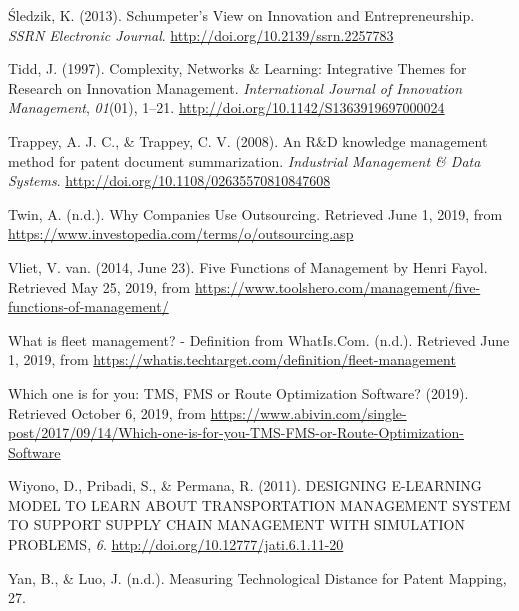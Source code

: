 \documentclass[12pt,twoside]{reedthesis}
\begin{document}
\leavevmode\hypertarget{ref-sledzikSchumpeterViewInnovation2013}{}%
Śledzik, K. (2013). Schumpeter's View on Innovation and Entrepreneurship. \emph{SSRN Electronic Journal}. \url{http://doi.org/10.2139/ssrn.2257783}

\leavevmode\hypertarget{ref-tiddComplexityNetworksLearning1997}{}%
Tidd, J. (1997). Complexity, Networks \& Learning: Integrative Themes for Research on Innovation Management. \emph{International Journal of Innovation Management}, \emph{01}(01), 1--21. \url{http://doi.org/10.1142/S1363919697000024}

\leavevmode\hypertarget{ref-trappeyKnowledgeManagementMethod2008}{}%
Trappey, A. J. C., \& Trappey, C. V. (2008). An R\&D knowledge management method for patent document summarization. \emph{Industrial Management \& Data Systems}. \url{http://doi.org/10.1108/02635570810847608}

\leavevmode\hypertarget{ref-alexandratwinWhyCompaniesUse}{}%
Twin, A. (n.d.). Why Companies Use Outsourcing. Retrieved June 1, 2019, from \url{https://www.investopedia.com/terms/o/outsourcing.asp}

\leavevmode\hypertarget{ref-vlietFiveFunctionsManagement2014}{}%
Vliet, V. van. (2014, June 23). Five Functions of Management by Henri Fayol. Retrieved May 25, 2019, from \url{https://www.toolshero.com/management/five-functions-of-management/}

\leavevmode\hypertarget{ref-WhatFleetManagement}{}%
What is fleet management? - Definition from WhatIs.Com. (n.d.). Retrieved June 1, 2019, from \url{https://whatis.techtarget.com/definition/fleet-management}

\leavevmode\hypertarget{ref-WhichOneYou2019}{}%
Which one is for you: TMS, FMS or Route Optimization Software? (2019). Retrieved October 6, 2019, from \url{https://www.abivin.com/single-post/2017/09/14/Which-one-is-for-you-TMS-FMS-or-Route-Optimization-Software}

\leavevmode\hypertarget{ref-wiyonoDESIGNINGELEARNINGMODEL2011}{}%
Wiyono, D., Pribadi, S., \& Permana, R. (2011). DESIGNING E-LEARNING MODEL TO LEARN ABOUT TRANSPORTATION MANAGEMENT SYSTEM TO SUPPORT SUPPLY CHAIN MANAGEMENT WITH SIMULATION PROBLEMS, \emph{6}. \url{http://doi.org/10.12777/jati.6.1.11-20}

\leavevmode\hypertarget{ref-yanMeasuringTechnologicalDistance}{}%
Yan, B., \& Luo, J. (n.d.). Measuring Technological Distance for Patent Mapping, 27.


\end{document}
